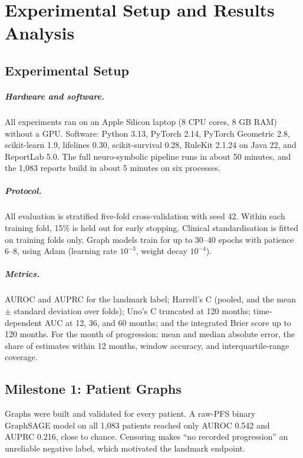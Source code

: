 \documentclass{mnnit}
\begin{document}
\chapter{Experimental Setup and Results Analysis}\label{ch:results}

\section{Experimental Setup}
\paragraph{Hardware and software.} All experiments ran on an Apple Silicon laptop (8 CPU cores, 8 GB RAM) without a
GPU. Software: Python 3.13, PyTorch 2.14, PyTorch Geometric 2.8, scikit-learn 1.9, lifelines 0.30, scikit-survival
0.28, RuleKit 2.1.24 on Java 22, and ReportLab 5.0. The full neuro-symbolic pipeline runs in about 50 minutes, and
the 1,083 reports build in about 5 minutes on six processes.

\paragraph{Protocol.} All evaluation is stratified five-fold cross-validation with seed 42. Within each training
fold, 15\% is held out for early stopping. Clinical standardisation is fitted on training folds only. Graph models
train for up to 30--40 epochs with patience 6--8, using Adam (learning rate $10^{-3}$, weight decay $10^{-4}$).

\paragraph{Metrics.} AUROC and AUPRC for the landmark label; Harrell's C (pooled, and the mean $\pm$ standard
deviation over folds); Uno's C truncated at 120 months; time-dependent AUC at 12, 36, and 60 months; and the
integrated Brier score up to 120 months. For the month of progression: mean and median absolute error, the share
of estimates within 12 months, window accuracy, and interquartile-range coverage.

\section{Milestone 1: Patient Graphs}
Graphs were built and validated for every patient. A raw-PFS binary GraphSAGE model on all 1,083 patients
reached only AUROC 0.542 and AUPRC 0.216, close to chance. Censoring makes ``no recorded progression'' an unreliable
negative label, which motivated the landmark endpoint.
\end{document}
